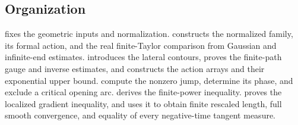 \subsection{Organization}

 fixes the geometric inputs and normalization.
 constructs the normalized family, its formal action,
and the real finite-Taylor comparison from Gaussian and infinite-end
estimates.   introduces the lateral contours, proves
the finite-path gauge and inverse estimates, and constructs the action
arrays and their exponential upper bound.   compute the nonzero jump,
determine its phase, and exclude a critical opening arc.
 derives the finite-power inequality.
 proves the localized gradient inequality, and
 uses it to obtain finite rescaled length, full smooth
convergence, and equality of every negative-time tangent measure.
